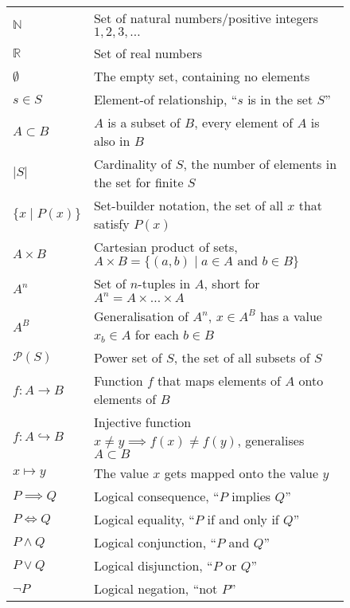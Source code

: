 \begin{figure}[h]
    \centering
    \begin{tabular}{ll}
        $\mathbb N$            & Set of natural numbers/positive integers $1,2,3,\dots$\\
        $\mathbb R$            & Set of real numbers\\
        $\emptyset$            & The empty set, containing no elements\\[1em]
        $s\in S$               & Element-of relationship, ``$s$ is in the set $S$''\\
        $A\subset B$           & $A$ is a subset of $B$, every element of $A$ is also in $B$\\
        $|S|$                  & Cardinality of $S$, the number of elements in the set for finite $S$\\
        $\{x\mid P(x)\}$       & Set-builder notation, the set of all $x$ that satisfy $P(x)$\\
        $A\times B$            & Cartesian product of sets, $A\times B=\{(a,b)\mid a\in A\text{ and }b\in B\}$\\
        $A^n$                  & Set of $n$-tuples in $A$, short for $A^n=A\times\dots\times A$\\
        $A^B$                  & Generalisation of $A^n$, $x\in A^B$ has a value $x_b\in A$ for each $b\in B$\\
        $\mathcal P(S)$        & Power set of $S$, the set of all subsets of $S$\\
        $f:A\rightarrow B$     & Function $f$ that maps elements of $A$ onto elements of $B$\\
        $f:A\hookrightarrow B$ & Injective function $x\neq y\implies f(x)\neq f(y)$, generalises $A\subset B$\\
        $x\mapsto y$           & The value $x$ gets mapped onto the value $y$\\[1em]
        $P\implies Q$          & Logical consequence, ``$P$ implies $Q$''\\
        $P\iff Q$              & Logical equality, ``$P$ if and only if $Q$''\\
        $P\mathrel\land Q$     & Logical conjunction, ``$P$ and $Q$''\\
        $P\mathrel\lor Q$      & Logical disjunction, ``$P$ or $Q$''\\
        $\neg P$               & Logical negation, ``not $P$''
    \end{tabular}
\end{figure}